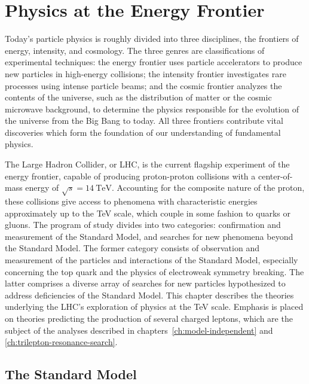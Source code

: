 \chapter{Physics at the Energy Frontier}\label{ch:theory}
Today's particle physics is roughly divided into three disciplines, the frontiers of energy, intensity, and cosmology. The three genres are classifications of experimental techniques:  the energy frontier uses particle accelerators to produce new particles in high-energy collisions; the intensity frontier investigates rare processes using intense particle beams; and the cosmic frontier analyzes the contents of the universe, such as the distribution of matter or the cosmic microwave background, to determine the physics responsible for the evolution of the universe from the Big Bang to today. All three frontiers contribute vital discoveries which form the foundation of our understanding of fundamental physics. 

The Large Hadron Collider, or LHC, is the current flagship experiment of the energy frontier, capable of producing proton-proton collisions with a center-of-mass energy of $\sqrt{s}=14~\mbox{TeV}$. Accounting for the composite nature of the proton, these collisions give access to phenomena with characteristic energies approximately up to the TeV scale, which couple in some fashion to quarks or gluons. The program of study divides into two categories: confirmation and measurement of the Standard Model, and searches for new phenomena beyond the Standard Model. The former category consists of observation and measurement of the particles and interactions of the Standard Model, especially concerning the top quark and the physics of electroweak symmetry breaking. The latter comprises a diverse array of searches for new particles hypothesized to address deficiencies of the Standard Model. This chapter describes the theories underlying the LHC's exploration of physics at the TeV scale. Emphasis is placed on theories predicting the production of several charged leptons, which are the subject of the analyses described in chapters~\ref{ch:model-independent} and \ref{ch:trilepton-resonance-search}. 



\section{The Standard Model}\label{sec:standard-model}
